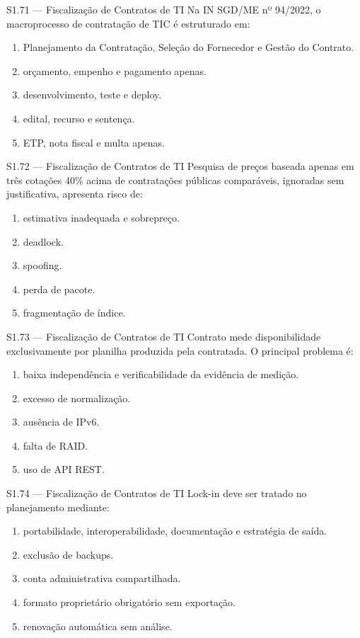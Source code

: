 \begin{questao}{S1.71 — Fiscalização de Contratos de TI}
Na IN SGD/ME nº 94/2022, o macroprocesso de contratação de TIC é estruturado em:
\begin{enumerate}[label=\Alph*)]\item Planejamento da Contratação, Seleção do Fornecedor e Gestão do Contrato.\item orçamento, empenho e pagamento apenas.\item desenvolvimento, teste e deploy.\item edital, recurso e sentença.\item ETP, nota fiscal e multa apenas.\end{enumerate}
\end{questao}

\begin{questao}{S1.72 — Fiscalização de Contratos de TI}
Pesquisa de preços baseada apenas em três cotações 40\% acima de contratações públicas comparáveis, ignoradas sem justificativa, apresenta risco de:
\begin{enumerate}[label=\Alph*)]\item estimativa inadequada e sobrepreço.\item deadlock.\item spoofing.\item perda de pacote.\item fragmentação de índice.\end{enumerate}
\end{questao}

\begin{questao}{S1.73 — Fiscalização de Contratos de TI}
Contrato mede disponibilidade exclusivamente por planilha produzida pela contratada. O principal problema é:
\begin{enumerate}[label=\Alph*)]\item baixa independência e verificabilidade da evidência de medição.\item excesso de normalização.\item ausência de IPv6.\item falta de RAID.\item uso de API REST.\end{enumerate}
\end{questao}

\begin{questao}{S1.74 — Fiscalização de Contratos de TI}
Lock-in deve ser tratado no planejamento mediante:
\begin{enumerate}[label=\Alph*)]\item portabilidade, interoperabilidade, documentação e estratégia de saída.\item exclusão de backups.\item conta administrativa compartilhada.\item formato proprietário obrigatório sem exportação.\item renovação automática sem análise.\end{enumerate}
\end{questao}

